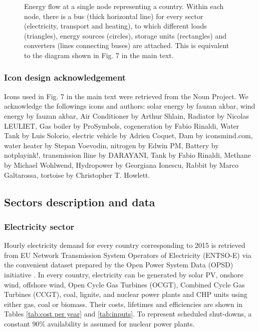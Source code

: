 \documentclass[3p]{elsarticle} %
\begin{document}
\begin{figure}[!t]
\begin{adjustbox}{scale=0.60,trim=5 6.8cm 0 0}
\begin{circuitikz}
  \end{circuitikz}

\end{adjustbox}
\caption{Energy flow at a single node representing a country. Within each node, there is a bus (thick horizontal line) for every sector (electricity, transport and heating), to which different loads (triangles), energy sources (circles), storage units (rectangles) and converters (lines connecting buses) are attached. This is equivalent to the diagram shown in Fig. 7 in the main text. }
\label{Fig_buses}
\end{figure}


\subsubsection{Icon design acknowledgement}
Icons used in Fig. 7 in the main text were retrieved from the Noun Project. We acknowledge the followings icons and authors: solar energy by fauzan akbar, wind energy by fauzan akbar, Air Conditioner by Arthur Shlain, Radiator by Nicolas LEULIET, Gas boiler by ProSymbols, cogeneration by Fabio Rinaldi, Water Tank by Luis Solorio, electric vehicle by Adrien Coquet, Dam by iconsmind.com, water heater by Stepan Voevodin, nitrogen by Edwin PM, Battery by notplayink!, transmission lline by DARAYANI, Tank by Fabio Rinaldi, Methane by Michael Wohlwend, Hydropower by Georgiana Ionescu, Rabbit by Marco Galtarossa, tortoise by Christopher T. Howlett.

\subsection{Sectors description and data}

\subsubsection{Electricity sector}
Hourly electricity demand for every country corresponding to 2015 is retrieved from EU Network Transmission System Operators of Electricity (ENTSO-E) via the convenient dataset prepared by the Open Power System Data (OPSD) initiative \cite{OPSD}. In every country, electricity can be generated by solar PV, onshore wind, offshore wind, Open Cycle Gas Turbines (OCGT), Combined Cycle Gas Turbines (CCGT), coal, lignite, and nuclear power plants and CHP units using either gas, coal or biomass. Their costs, lifetimes and efficiencies are shown in Tables \ref{tab:cost per year} and \ref{tab:inputs}.  To represent scheduled shut-downs, a constant 90\% availability is assumed for nuclear power plants. \
\end{document}
